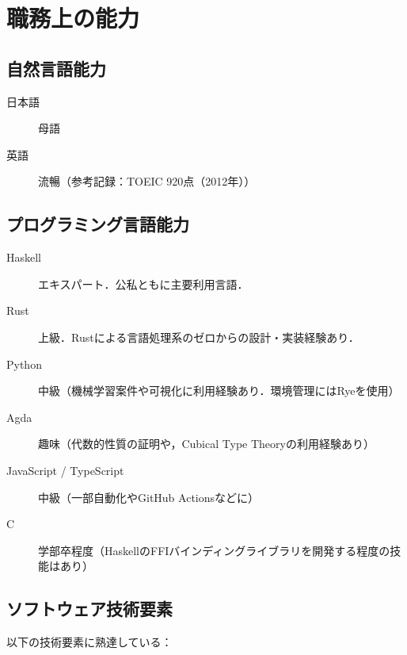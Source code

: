 \documentclass[a4j]{ltjsarticle}
\begin{document}
\section*{職務上の能力}

\subsection*{自然言語能力}
\begin{description}
  \item[日本語] 母語
  \item[英語] 流暢（参考記録：TOEIC 920点（2012年））
\end{description}

\subsection*{プログラミング言語能力}

\begin{description}
  \item[Haskell] エキスパート．公私ともに主要利用言語．
  \item[Rust] 上級．Rustによる言語処理系のゼロからの設計・実装経験あり．
  \item[Python] 中級（機械学習案件や可視化に利用経験あり．環境管理にはRyeを使用）
  \item[Agda] 趣味（代数的性質の証明や，Cubical Type Theoryの利用経験あり）
  \item[JavaScript / TypeScript] 中級（一部自動化やGitHub Actionsなどに）
  \item[C] 学部卒程度（HaskellのFFIバインディングライブラリを開発する程度の技能はあり）
\end{description}

\subsection*{ソフトウェア技術要素}
以下の技術要素に熟達している：
\end{document}
